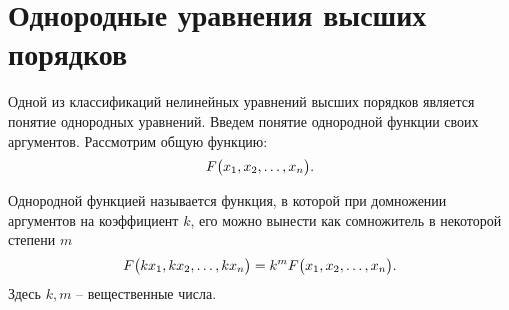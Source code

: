 \section{Однородные уравнения высших порядков}

    Одной из классификаций нелинейных уравнений высших порядков является понятие однородных уравнений. Введем понятие однородной функции своих аргументов. Рассмотрим общую функцию:
    \[
        F \bigl( x_1, x_2, \dots, x_n \bigr).
    \]

    Однородной функцией называется функция, в которой при домножении аргументов на коэффициент $ k $, его можно вынести как сомножитель в некоторой степени $ m $
    \[
        F \bigl( kx_1, kx_2, \dots, kx_n \bigr) = k^m F \bigl( x_1, x_2, \dots, x_n \bigr).
    \]
    Здесь $ k, m $ -- вещественные числа.


